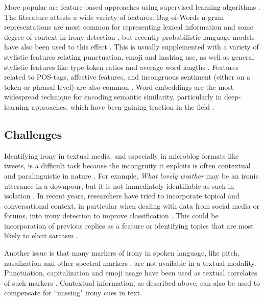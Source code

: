More popular are feature-based approaches using supervised learning algorithms \cite{sarcasm_detection}. The literature attests a wide variety of features. Bag-of-Words n-gram representations are most common for representing lexical information and some degree of context in irony detection \cite{reyes2012making, liebrecht2013perfect}, but recently probabilistic language models have also been used to this effect . This is usually supplemented with a variety of stylistic features relating punctuation, emoji and hashtag use, as well as general stylistic features like type-token ratios and average word lengths .  Features related to POS-tags, affective features, and incongruous sentiment (either on a token or phrasal level) are also common \cite{riloff2013sarcasm, joshi2015harnessing,sarcasm_detection}. Word embeddings are the most widespread technique for encoding semantic similarity, particularly in deep-learning approaches, which have been gaining traction in the field \cite{joshi2016word, zhang2019irony}. 



\subsection{Challenges}
Identifying irony in textual media, and especially in microblog formats like tweets, is a difficult task because the incongruity it exploits is often  contextual and paralinguistic in nature \cite{sarcasm_detection}. For example, \textit{What lovely weather} may be an ironic utterance in a downpour, but it is not immediately identifiable as such in isolation \cite{ironydefinition}. In recent years, researchers have tried to incorporate topical and conversational context, in particular when dealing with data from social media or forums, into irony detection to improve classification \cite{ sarcasm_detection}. This could be incorporation of previous replies as a feature \cite{joshi2015harnessing, wallace2015sparse} or identifying topics that are most likely to elicit sarcasm \cite{wang2015twitter}.

Another issue is that many markers of irony in spoken language, like pitch, nasalization and other spectral markers \cite{attardo2000irony, tepperman2006yeahright}, are not available in a textual modality. Punctuation, capitalization and emoji usage have been used as textual correlates of such markers \cite{irony_detect_twitter, van2018exploring}. Contextual information, as described above, can also be used to compensate for ``missing" irony cues in text.


